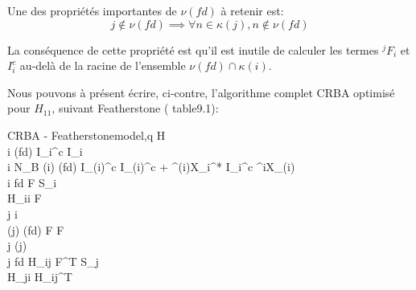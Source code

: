 \documentclass{report}
\begin{document}
\setlength{\columnseprule}{0.5pt}
\begin{multicols}{2}\raggedcolumns
\begin{flushleft}
Une des propriétés importantes de $\nu(fd)$ à retenir est:
\begin{equation*}
j \notin \nu(fd) \implies \forall n \in \kappa(j), n \notin \nu(fd)
\end{equation*}

La conséquence de cette propriété est qu'il est inutile de calculer les termes $^jF_i$ et $I_i^c$ au-delà de la racine de l'ensemble $\nu(fd) \cap \kappa(i)$.
\end{flushleft}

Nous pouvons à présent écrire, ci-contre, l'algorithme complet CRBA optimisé pour $H_{11}$, suivant Featherstone (\cite{bib_featherstone} table9.1):\\

    	\begin{spacing}{1.5}
		\begin{pseudocode}{CRBA - Featherstone}{model,q} \label{algo_crbaFeatherstoneH11}
    H  \\
		\FOREACH i \in \nu(fd) \DO
		  I_i^c \GETS I_i \\
		\FOR i \GETS N_B  \DO
		\BEGIN
		  \IF \lambda(i) \in \nu(fd)
		  \THEN
		    I_{\lambda(i)}^c \GETS I_{\lambda(i)}^c + {^{\lambda(i)}X_i^*} \: {I_i^c} \: {^iX_{\lambda(i)}} \\
		  \IF i \in fd \THEN
		  \BEGIN
			  F  \: S_i \\
			  H_{ii}  F \\
			  j \GETS i \\
			  \WHILE \lambda(j) \in \nu(fd) \DO
			  \BEGIN
			    F  F \\
			    j \GETS \lambda(j) \\
			    \IF j \in fd \THEN
			    \BEGIN
				    H_{ij} \GETS F^T S_j \\
				    H_{ji} \GETS H_{ij}^T
			    \END
			  \END
			\END
		\END
	  \end{pseudocode}
	  \end{spacing}

\end{multicols}
\end{document}
